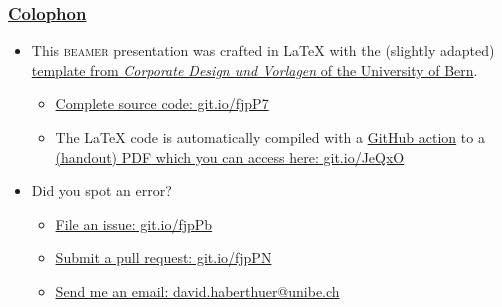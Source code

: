 \begin{frame}
	\frametitle{\href{https://en.wikipedia.org/wiki/Colophon_(publishing)}{Colophon}}
	\begin{itemize}
		\item This \textsc{beamer} presentation was crafted in \LaTeX\xspace with the (slightly adapted) \href{http://intern.unibe.ch/dienstleistungen/corporate_design_und_vorlagen/praesentationen/}{template from \emph{Corporate Design und Vorlagen} of the University of Bern}.
		\begin{itemize}
			\item \href{https://github.com/habi/lecture.microtomography/}{Complete source code: git.io/fjpP7}
			\item The \LaTeX\xspace code is automatically compiled with a \href{https://github.com/actions}{GitHub action} to a \href{https://habi.github.io/Lecture.Microtomography/XRayMicroTomography.Handout.pdf}{(handout) PDF which you can access here: git.io/JeQxO}
		\end{itemize}
		\item Did you spot an error?
		\begin{itemize}
			\item \href{https://github.com/habi/lecture.microtomography/issues}{File an issue: git.io/fjpPb}
			\item \href{https://github.com/habi/lecture.microtomography/pulls}{Submit a pull request: git.io/fjpPN}
			\item \href{mailto:david.haberthuer@unibe.ch?subject=Error\%20in\%20the\%20(micro)-tomography\%20lecture\&body=https://xkcd.com/386/}{Send me an email: david.haberthuer@unibe.ch}
		\end{itemize}
	\end{itemize}
\end{frame}


